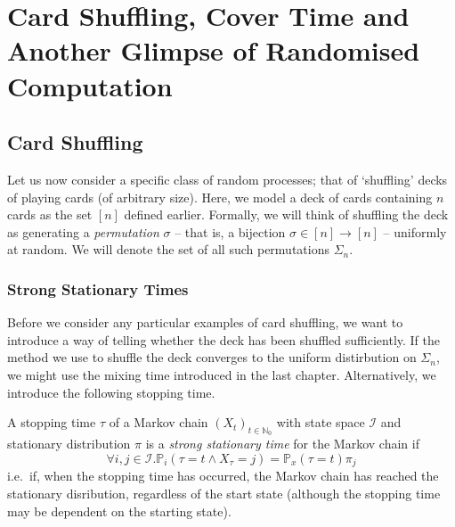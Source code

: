 \chapter{Card Shuffling, Cover Time and Another Glimpse of Randomised Computation}

\section{Card Shuffling}
	Let us now consider a specific class of random processes; that of `shuffling' decks of 
	playing cards (of arbitrary size). Here, we model a deck of cards containing $n$ cards
	as the set $[n]$ defined earlier. Formally, we will think of shuffling the deck as 
	generating a \emph{permutation} $\sigma$ -- that is, a bijection $\sigma \in [n]\rightarrow
	[n]$ -- uniformly at random. We will denote the set of all such permutations $\Sigma_n$.

	\subsection{Strong Stationary Times}
		Before we consider any particular examples of card shuffling, we want to
		introduce a way of telling whether the deck has been shuffled sufficiently. 
		If the method we use to shuffle the deck converges to the uniform distirbution on
		$\Sigma_n$, we might use the mixing time introduced in the last chapter. 
		Alternatively, we introduce the following stopping time.
		\begin{definition}
			A stopping time $\tau$ of a Markov chain $(X_t)_{t\in\mathbb{N}_0}$ with
			state space $\mathcal{I}$ and stationary distribution $\pi$ is a 
			\emph{strong stationary time} for the Markov chain if 
			$$
				\forall i,j \in \mathcal{I}.
				\mathbb{P}_i(\tau = t \land X_\tau = j) = \mathbb{P}_x(\tau=t)\pi_j
			$$
			i.e.\ if, when the stopping time has occurred, the Markov chain has reached
			the stationary disribution, regardless of the start state (although the 
			stopping time may be dependent on the starting state).
		\end{definition}

